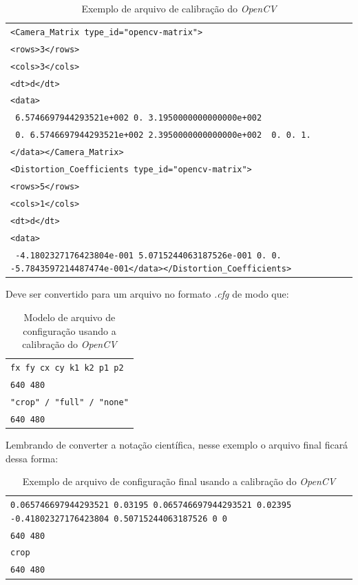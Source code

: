 \begin{table}[!ht]\label{tb:9}
\begin{tabular}{| p{\textwidth}|}
\hline
\texttt{<Camera\_Matrix type\_id="opencv-matrix">}\\
\texttt{<rows>3</rows>}\\
\texttt{<cols>3</cols>}\\
\texttt{<dt>d</dt>}\\
\texttt{<data>}\\
\texttt{ 6.5746697944293521e+002 0. 3.1950000000000000e+002}\\
\texttt{ 0. 6.5746697944293521e+002 2.3950000000000000e+002}\
\texttt{ 0. 0. 1.}\\
\texttt{</data></Camera\_Matrix>}\\
\texttt{<Distortion\_Coefficients type\_id="opencv-matrix">}\\
\texttt{<rows>5</rows>}\\
\texttt{<cols>1</cols>}\\
\texttt{<dt>d</dt>}\\
\texttt{<data>}\\
\texttt{ -4.1802327176423804e-001 5.0715244063187526e-001 0. 0. -5.7843597214487474e-001</data></Distortion\_Coefficients>}\\
 \hline
\end{tabular}
\caption{Exemplo de arquivo de calibração do \textit{OpenCV}}
\end{table}

Deve ser convertido para um arquivo no formato \textit{.cfg} de modo que:

\begin{table}[!ht]\label{tb:10}
\begin{tabular}{| p{\textwidth}|}
\hline
\texttt{fx fy cx cy k1 k2 p1 p2}\\
\texttt{640 480}\\
\texttt{"crop" / "full" / "none"}\\
\texttt{640 480}\\
 \hline
\end{tabular}
\caption{Modelo de arquivo de configuração usando a calibração do \textit{OpenCV}}
\end{table}

Lembrando de converter a notação científica, nesse exemplo o arquivo final ficará dessa forma:

\begin{table}[!ht]\label{tb:11}
\begin{tabular}{| p{\textwidth}|}
\hline
\texttt{0.065746697944293521 0.03195 0.065746697944293521 0.02395 -0.41802327176423804 0.50715244063187526 0 0}\\
\texttt{640 480}\\
\texttt{crop}\\
\texttt{640 480}\\
 \hline
\end{tabular}
\caption{Exemplo de arquivo de configuração final usando a calibração do \textit{OpenCV}}
\end{table}

